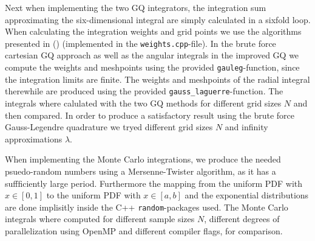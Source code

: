 \documentclass[10pt, twocolumn]{aastex62}
\begin{document}
Next when implementing the two GQ integrators, the integration sum approximating
the six-dimensional integral are simply calculated in a sixfold loop. When
calculating the integration weights and grid points we use the algorithms
presented in (\cite{press:2007}) (implemented in the \texttt{weights.cpp}-file).
In the brute force cartesian GQ approach as well as the angular integrals in the
improved GQ we compute the weights and meshpoints using the provided
\texttt{gauleg}-function, since the integration limits are finite. The weights
and meshpoints of the radial integral therewhile are produced using the provided
\texttt{gauss\_laguerre}-function. The integrals where calulated with the two GQ
methods for different grid sizes $N$ and then compared. In order to produce a
satisfactory result using the brute force Gauss-Legendre quadrature we tryed
different grid sizes $N$ and infinity approximations $\lambda$.

When implementing the Monte Carlo integrations, we produce the needed
psuedo-random numbers using a Mersenne-Twister algorithm, as it has a
suffficiently large period. Furthermore the mapping from the uniform PDF with
$x\in[0,1]$ to the uniform PDF with $x\in[a,b]$ and the exponential
distributions are done implisitly inside the C++ \texttt{random}-packages used.
The Monte Carlo integrals where computed for different sample sizes $N$,
different degrees of parallelization using OpenMP and different compiler flags,
for comparison. 
\end{document}
